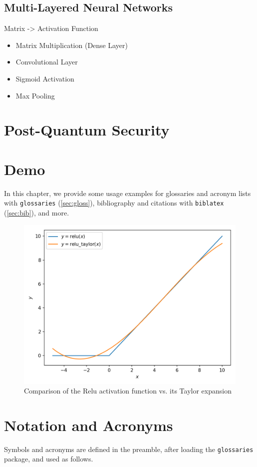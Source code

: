 \subsection{Multi-Layered Neural Networks}
Matrix -> Activation Function
\begin{itemize}
  \item Matrix Multiplication (Dense Layer)
  \item Convolutional Layer
  \item Sigmoid Activation
  \item Max Pooling
\end{itemize}

\section{Post-Quantum Security}

\section{Demo}
In this chapter, we provide some usage examples for
glossaries and acronym lists with \texttt{glossaries} (\autoref{sec:gloss}),
bibliography and citations with \texttt{biblatex} (\autoref{sec:bib}), and more.

\begin{figure}[H]
  \centering
  \includegraphics[width=0.8\linewidth]{figures/taylor-relu.png}
  \caption{Comparison of the Relu activation function vs. its Taylor expansion}
\end{figure}

\section{Notation and Acronyms}
\label{sec:gloss}
Symbols and acronyms are defined in the preamble, after loading the \texttt{glossaries} package, and used as follows.

